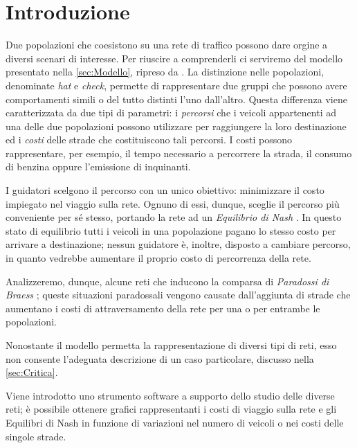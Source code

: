 \section*{Introduzione}

Due popolazioni che coesistono su una rete di traffico possono dare orgine a diversi scenari di interesse. Per riuscire a comprenderli ci serviremo del 
modello presentato nella \autoref{sec:Modello}, ripreso da \cite{MR4911797}. La distinzione nelle popolazioni, denominate
\textit{hat} e \textit{check}, permette di rappresentare due gruppi che possono avere comportamenti simili o del tutto distinti l'uno dall'altro.
Questa differenza viene caratterizzata da due tipi di parametri: i \textit{percorsi} che i veicoli appartenenti ad una delle due popolazioni possono utilizzare per raggiungere la loro destinazione
ed i \textit{costi} delle strade che costituiscono tali percorsi. I costi possono rappresentare, per esempio, il tempo necessario a percorrere la strada, il consumo di benzina oppure l'emissione di inquinanti.

I guidatori scelgono il percorso con un unico obiettivo: minimizzare il costo impiegato nel viaggio sulla rete. Ognuno di essi, dunque,
sceglie il percorso più conveniente per sé stesso, portando la rete ad un \textit{Equilibrio di Nash} \cite{nash1950noncooperative}. In questo stato di equilibrio tutti 
i veicoli in una popolazione pagano lo stesso costo per arrivare a destinazione; nessun guidatore è, inoltre, disposto a cambiare percorso, in quanto vedrebbe
aumentare il proprio costo di percorrenza della rete.

Analizzeremo, dunque, alcune reti che inducono la comparsa di \textit{Paradossi di Braess} \cite{BraessParadox};
queste situazioni paradossali vengono causate dall'aggiunta di strade che aumentano i costi di attraversamento della rete per una o per entrambe le popolazioni.

Nonostante il modello permetta la rappresentazione di diversi tipi di reti, esso non consente l'adeguata descrizione di un caso particolare, discusso nella
\autoref{sec:Critica}.

Viene introdotto uno strumento software a supporto dello studio delle diverse reti; è possibile ottenere grafici rappresentanti i costi di
viaggio sulla rete e gli Equilibri di Nash in funzione di variazioni nel numero di veicoli o nei costi delle singole strade. 